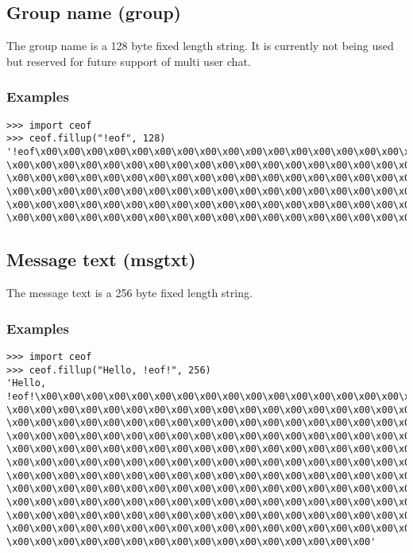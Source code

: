 \subsection{Group name (group)}
The group name is a 128 byte fixed length string. It is currently not being
used but reserved for future support of multi user chat.
\subsubsection{Examples}
\begin{verbatim}
>>> import ceof
>>> ceof.fillup("!eof", 128)
'!eof\x00\x00\x00\x00\x00\x00\x00\x00\x00\x00\x00\x00\x00\x00\x00\x00\x00\x00\x00\x00
\x00\x00\x00\x00\x00\x00\x00\x00\x00\x00\x00\x00\x00\x00\x00\x00\x00\x00\x00\x00\x00
\x00\x00\x00\x00\x00\x00\x00\x00\x00\x00\x00\x00\x00\x00\x00\x00\x00\x00\x00\x00\x00
\x00\x00\x00\x00\x00\x00\x00\x00\x00\x00\x00\x00\x00\x00\x00\x00\x00\x00\x00\x00\x00
\x00\x00\x00\x00\x00\x00\x00\x00\x00\x00\x00\x00\x00\x00\x00\x00\x00\x00\x00\x00\x00
\x00\x00\x00\x00\x00\x00\x00\x00\x00\x00\x00\x00\x00\x00\x00\x00\x00\x00\x00\x00'
\end{verbatim}
\subsection{Message text (msgtxt)}
The message text is a 256 byte fixed length string.
\subsubsection{Examples}
\begin{verbatim}
>>> import ceof
>>> ceof.fillup("Hello, !eof!", 256)
'Hello, !eof!\x00\x00\x00\x00\x00\x00\x00\x00\x00\x00\x00\x00\x00\x00\x00\x00\x00\x00
\x00\x00\x00\x00\x00\x00\x00\x00\x00\x00\x00\x00\x00\x00\x00\x00\x00\x00\x00\x00\x00
\x00\x00\x00\x00\x00\x00\x00\x00\x00\x00\x00\x00\x00\x00\x00\x00\x00\x00\x00\x00\x00
\x00\x00\x00\x00\x00\x00\x00\x00\x00\x00\x00\x00\x00\x00\x00\x00\x00\x00\x00\x00\x00
\x00\x00\x00\x00\x00\x00\x00\x00\x00\x00\x00\x00\x00\x00\x00\x00\x00\x00\x00\x00\x00
\x00\x00\x00\x00\x00\x00\x00\x00\x00\x00\x00\x00\x00\x00\x00\x00\x00\x00\x00\x00\x00
\x00\x00\x00\x00\x00\x00\x00\x00\x00\x00\x00\x00\x00\x00\x00\x00\x00\x00\x00\x00\x00
\x00\x00\x00\x00\x00\x00\x00\x00\x00\x00\x00\x00\x00\x00\x00\x00\x00\x00\x00\x00\x00
\x00\x00\x00\x00\x00\x00\x00\x00\x00\x00\x00\x00\x00\x00\x00\x00\x00\x00\x00\x00\x00
\x00\x00\x00\x00\x00\x00\x00\x00\x00\x00\x00\x00\x00\x00\x00\x00\x00\x00\x00\x00\x00
\x00\x00\x00\x00\x00\x00\x00\x00\x00\x00\x00\x00\x00\x00\x00\x00\x00\x00\x00\x00\x00
\x00\x00\x00\x00\x00\x00\x00\x00\x00\x00\x00\x00\x00\x00\x00\x00'
\end{verbatim}
